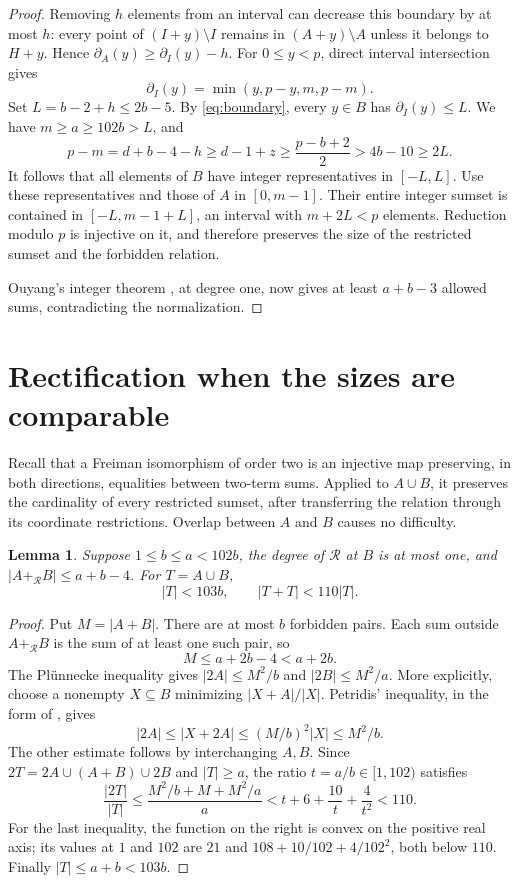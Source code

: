 \documentclass[11pt]{article}
\newtheorem{lemma}[theorem]{Lemma}
\theoremstyle{remark}
\newcommand{\rs}{+_{\mathcal R}}
\begin{document}
\begin{proof}
Removing $h$ elements from an interval can decrease this boundary by at most $h$: every point of $(I+y)\setminus I$ remains in $(A+y)\setminus A$ unless it belongs to $H+y$. Hence $\partial_A(y)\ge\partial_I(y)-h$. For $0\le y<p$, direct interval intersection gives
\[
 \partial_I(y)=\min(y,p-y,m,p-m).
\]
Set $L=b-2+h\le2b-5$. By \eqref{eq:boundary}, every $y\in B$ has $\partial_I(y)\le L$. We have $m\ge a\ge102b>L$, and
\[
 p-m=d+b-4-h\ge d-1+z\ge\frac{p-b+2}{2}
 >4b-10\ge2L.
\]
It follows that all elements of $B$ have integer representatives in $[-L,L]$. Use these representatives and those of $A$ in $[0,m-1]$. Their entire integer sumset is contained in $[-L,m-1+L]$, an interval with $m+2L<p$ elements. Reduction modulo $p$ is injective on it, and therefore preserves the size of the restricted sumset and the forbidden relation.

Ouyang's integer theorem \cite[Theorem~1.5(i)]{Ouyang}, at degree one, now gives at least $a+b-3$ allowed sums, contradicting the normalization.
\end{proof}

\section{Rectification when the sizes are comparable}
Recall that a Freiman isomorphism of order two is an injective map preserving, in both directions, equalities between two-term sums. Applied to $A\cup B$, it preserves the cardinality of every restricted sumset, after transferring the relation through its coordinate restrictions. Overlap between $A$ and $B$ causes no difficulty.

\begin{lemma}\label{lem:doubling}
Suppose $1\le b\le a<102b$, the degree of $\mathcal R$ at $B$ is at most one, and $|A\rs B|\le a+b-4$. For $T=A\cup B$,
\[
 |T|<103b,\qquad |T+T|<110|T|.
\]
\end{lemma}
\begin{proof}
Put $M=|A+B|$. There are at most $b$ forbidden pairs. Each sum outside $A\rs B$ is the sum of at least one such pair, so
\[
 M\le a+2b-4<a+2b.
\]
The Pl\"unnecke inequality gives $|2A|\le M^2/b$ and $|2B|\le M^2/a$. More explicitly, choose a nonempty $X\subseteq B$ minimizing $|X+A|/|X|$. Petridis' inequality, in the form of \cite[Theorem~2.4]{Grynkiewicz}, gives
\[
 |2A|\le|X+2A|\le(M/b)^2|X|\le M^2/b.
\]
The other estimate follows by interchanging $A,B$. Since $2T=2A\cup(A+B)\cup2B$ and $|T|\ge a$, the ratio $t=a/b\in[1,102)$ satisfies
\[
 \frac{|2T|}{|T|}
 \le\frac{M^2/b+M+M^2/a}{a}
 <t+6+\frac{10}{t}+\frac4{t^2}<110.
\]
For the last inequality, the function on the right is convex on the positive real axis; its values at $1$ and $102$ are $21$ and $108+10/102+4/102^2$, both below $110$. Finally $|T|\le a+b<103b$.
\end{proof}
\end{document}
